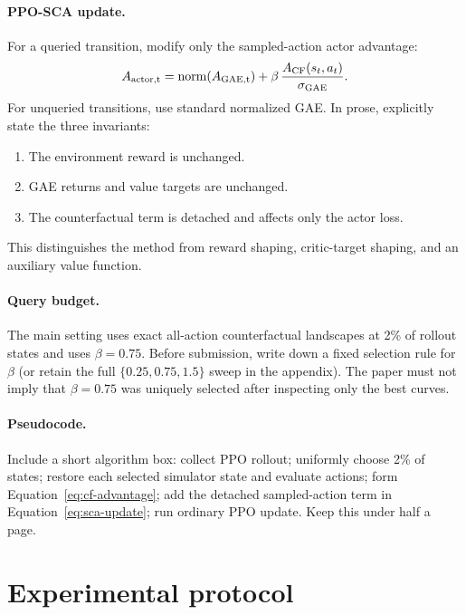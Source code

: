 \documentclass[11pt]{article}
\begin{document}
\paragraph{PPO-SCA update.}
For a queried transition, modify only the sampled-action actor advantage:
\begin{equation}
 A_{\rm actor,t} = \operatorname{norm}(A_{\rm GAE,t}) +
 \beta\,\frac{A_{\rm CF}(s_t,a_t)}{\sigma_{\rm GAE}}.
 \label{eq:sca-update}
\end{equation}
For unqueried transitions, use standard normalized GAE. In prose, explicitly
state the three invariants:
\begin{enumerate}[leftmargin=1.6em]
  \item The environment reward is unchanged.
  \item GAE returns and value targets are unchanged.
  \item The counterfactual term is detached and affects only the actor loss.
\end{enumerate}
This distinguishes the method from reward shaping, critic-target shaping, and
an auxiliary value function.

\paragraph{Query budget.}
The main setting uses exact all-action counterfactual landscapes at 2\% of
rollout states and uses $\beta=0.75$. Before submission, write down a fixed
selection rule for $\beta$ (or retain the full $\{0.25,0.75,1.5\}$ sweep in the
appendix). The paper must not imply that $\beta=0.75$ was uniquely selected
after inspecting only the best curves.

\paragraph{Pseudocode.}
Include a short algorithm box: collect PPO rollout; uniformly choose 2\% of
states; restore each selected simulator state and evaluate actions; form
Equation~\eqref{eq:cf-advantage}; add the detached sampled-action term in
Equation~\eqref{eq:sca-update}; run ordinary PPO update. Keep this under half a
page.

\section{Experimental protocol}
\label{sec:protocol}
\end{document}

